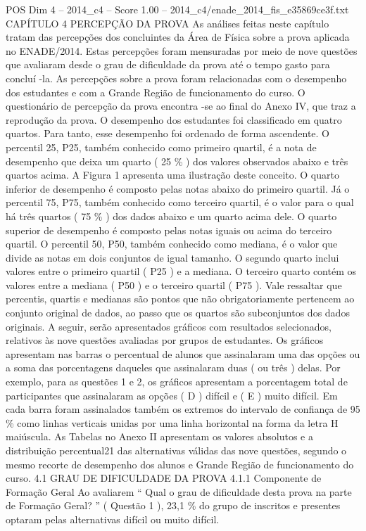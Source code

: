 \begin{textsample}{POS Dim 4 – 2014\_c4 – Score 1.00 – 2014\_c4/enade\_2014\_fis\_e35869ce3f.txt}  \label{ex:f4_pos_203}
CAPÍTULO 4 PERCEPÇÃO DA PROVA As análises feitas neste capítulo tratam das percepções dos concluintes da Área de Física sobre a prova aplicada no ENADE/2014.
Estas percepções foram mensuradas por meio de nove questões que avaliaram desde o grau de dificuldade da prova até o tempo gasto para concluí -la.
As percepções sobre a prova foram relacionadas com o desempenho dos estudantes e com a Grande Região de funcionamento do curso.
O questionário de percepção da prova encontra -se ao final do Anexo IV, que traz a reprodução da prova.
O desempenho dos estudantes foi classificado em quatro quartos.
Para tanto, esse desempenho foi ordenado de forma ascendente.
O percentil 25, P25, também conhecido como primeiro quartil, é a nota de desempenho que deixa um quarto ( 25 \% ) dos valores observados abaixo e três quartos acima.
A Figura 1 apresenta uma ilustração deste conceito.
O quarto inferior de desempenho é composto pelas notas abaixo do primeiro quartil.
Já o percentil 75, P75, também conhecido como terceiro quartil, é o valor para o qual há três quartos ( 75 \% ) dos dados abaixo e um quarto acima dele.
O quarto superior de desempenho é composto pelas notas iguais ou acima do terceiro quartil.
O percentil 50, P50, também conhecido como mediana, é o valor que divide as notas em dois conjuntos de igual tamanho.
O segundo quarto inclui valores entre o primeiro quartil ( P25 ) e a mediana.
O terceiro quarto contém os valores entre a mediana ( P50 ) e o terceiro quartil ( P75 ).
Vale ressaltar que percentis, quartis e medianas são pontos que não obrigatoriamente pertencem ao conjunto original de dados, ao passo que os quartos são subconjuntos dos dados originais.
A seguir, serão apresentados gráficos com resultados selecionados, relativos às nove questões avaliadas por grupos de estudantes.
Os gráficos apresentam nas barras o percentual de alunos que assinalaram uma das opções ou a soma das porcentagens daqueles que assinalaram duas ( ou três ) delas.
Por exemplo, para as questões 1 e 2, os gráficos apresentam a porcentagem total de participantes que assinalaram as opções ( D ) difícil e ( E ) muito difícil.
Em cada barra foram assinalados também os extremos do intervalo de confiança de 95 \% como linhas verticais unidas por uma linha horizontal na forma da letra H maiúscula.
As Tabelas no Anexo II apresentam os valores absolutos e a distribuição percentual21 das alternativas válidas das nove questões, segundo o mesmo recorte de desempenho dos alunos e Grande Região de funcionamento do curso. 4.1 GRAU DE DIFICULDADE DA PROVA 4.1.1 Componente de Formação Geral Ao avaliarem “ Qual o grau de dificuldade desta prova na parte de Formação Geral? ” ( Questão 1 ), 23,1 \% do grupo de inscritos e presentes optaram pelas alternativas difícil ou muito difícil.

\end{textsample}

